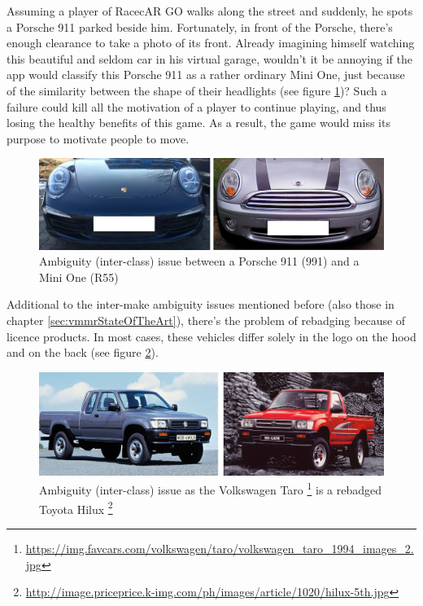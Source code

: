 Assuming a player of RacecAR GO walks along the street and suddenly, he spots a Porsche 911 parked beside him. Fortunately, in front of the Porsche, there's enough clearance to take a photo of its front. Already imagining himself watching this beautiful and seldom car in his virtual garage, wouldn't it be annoying if the app would classify this Porsche 911 as a rather ordinary Mini One, just because of the similarity between the shape of their headlights (see figure \ref{fig:ambiguityPorsche})? Such a failure could kill all the motivation of a player to continue playing, and thus losing the healthy benefits of this game. As a result, the game would miss its purpose to motivate people to move.

\begin{figure}[btph]
  \centering
        \includegraphics[width=.75\linewidth]{gfx/ambiguity_porsche_911_mini}
        \caption{Ambiguity (inter-class) issue between a Porsche 911 (991) and a Mini One (R55)}
        \label{fig:ambiguityPorsche}
\end{figure}
Additional to the inter-make ambiguity issues mentioned before (also those in chapter \ref{sec:vmmrStateOfTheArt}), there's the problem of rebadging because of licence products. In most cases, these vehicles differ solely in the logo on the hood and on the back (see figure \ref{fig:ambiguityRebadging}).

\begin{figure}[btph]
  \centering
        \includegraphics[width=.75\linewidth]{gfx/ambiguity_rebadging}
        \caption{Ambiguity (inter-class) issue as the Volkswagen Taro \footnote{\url{https://img.favcars.com/volkswagen/taro/volkswagen_taro_1994_images_2.jpg}} is a rebadged Toyota Hilux \footnote{\url{http://image.priceprice.k-img.com/ph/images/article/1020/hilux-5th.jpg}}}
        \label{fig:ambiguityRebadging}
\end{figure}

